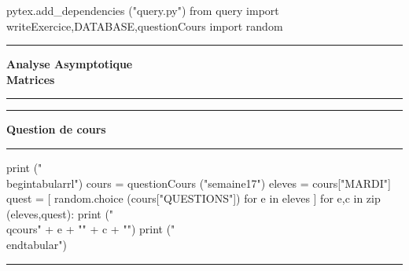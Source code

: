 \documentclass[11pt]{article}
\newcounter{exo}
\newcommand{\qcours}[2]{\textbf{#1} & #2 \\}
\begin{document}
    \begin{pycode}
pytex.add_dependencies ("query.py")
from query import writeExercice,DATABASE,questionCours
import random
    \end{pycode}


\begin{center}
\rule{15em}{2pt}


\vspace{1em}
\textbf{\huge{Analyse Asymptotique \\ Matrices}}
\vspace{0.5em}


\rule{15em}{2pt}
\end{center}



    \begin{center}
        \rule[0.23em]{1.5em}{1pt} 
        \textbf{Question de cours}
        \rule[0.23em]{24em}{1pt}
    \end{center}
    

\begin{center}
\begin{minipage}{0.8\linewidth}
    \begin{pycode}
print ("\\begin{tabular}{rl}")
cours  = questionCours ("semaine17")
eleves = cours["MARDI"]
quest  = [ random.choice (cours["QUESTIONS"]) for e in eleves ] 
for e,c in zip (eleves,quest):
    print ("\\qcours{" + e + "}{" + c +  "}")
print ("\\end{tabular}")
    \end{pycode}
\end{minipage}
\end{center}

    \begin{center}
        \rule{35em}{1pt}
    \end{center}
    
\end{document}
